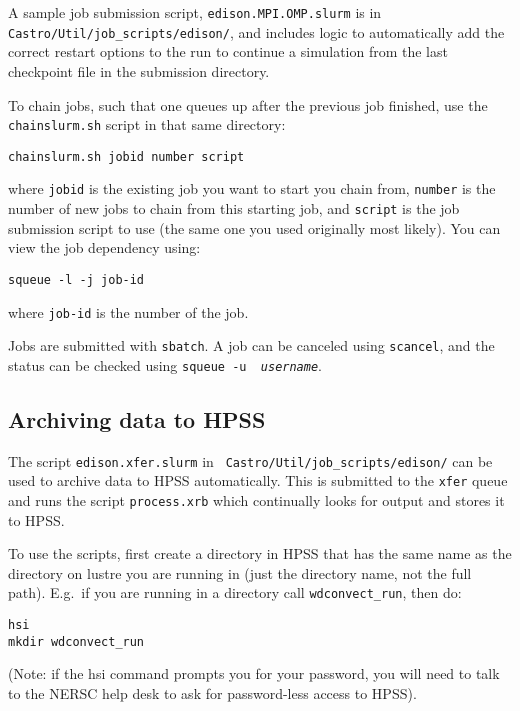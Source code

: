 A sample job submission script, {\tt edison.MPI.OMP.slurm} is in {\tt
  Castro/Util/job\_scripts/edison/}, and includes logic to
automatically add the correct restart options to the run to continue a
simulation from the last checkpoint file in the submission directory.

To chain jobs, such that one queues up after the previous job finished,         
use the {\tt chainslurm.sh} script in that same directory:
\begin{verbatim}
chainslurm.sh jobid number script
\end{verbatim}
where {\tt jobid} is the existing job you want to start you chain
from, {\tt number} is the number of new jobs to chain from this
starting job, and {\tt script} is the job submission script to use
(the same one you used originally most likely).  You can view the job
dependency using:
\begin{verbatim}                                                                
squeue -l -j job-id                                                             
\end{verbatim}                                                                  
where {\tt job-id} is the number of the job.                                    
                                                                                
Jobs are submitted with {\tt sbatch}.  A job can be canceled using              
{\tt scancel}, and the status can be checked using {\tt squeue -u {\em          
username}}.                                                                     


\subsection{Archiving data to HPSS}

The script {\tt edison.xfer.slurm} in {\tt
  Castro/Util/job\_scripts/edison/} can be used to archive data to
HPSS automatically.  This is submitted to the {\tt xfer} queue and
runs the script {\tt process.xrb} which continually looks for output
and stores it to HPSS.

To use the scripts, first create a directory in HPSS that has the same          
name as the directory on lustre you are running in (just the directory          
name, not the full path).  E.g.\ if you are running in a directory              
call {\tt wdconvect\_run}, then do:                                             
\begin{verbatim}                                                                
hsi                                                                             
mkdir wdconvect_run                                                             
\end{verbatim}                                                                  
(Note: if the hsi command prompts you for your password, you will need          
to talk to the NERSC help desk to ask for password-less access to                
HPSS).                                                                          
                                                                                
